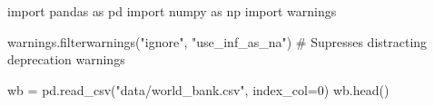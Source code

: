 \documentclass[
  letterpaper,
  DIV=11,
  numbers=noendperiod]{scrreprt}
\newenvironment{Shaded}{\begin{snugshade}}{\end{snugshade}}
\newcommand{\CommentTok}[1]{\textcolor[rgb]{0.37,0.37,0.37}{#1}}
\newcommand{\DecValTok}[1]{\textcolor[rgb]{0.68,0.00,0.00}{#1}}
\newcommand{\ImportTok}[1]{\textcolor[rgb]{0.00,0.46,0.62}{#1}}
\newcommand{\NormalTok}[1]{\textcolor[rgb]{0.00,0.23,0.31}{#1}}
\newcommand{\OperatorTok}[1]{\textcolor[rgb]{0.37,0.37,0.37}{#1}}
\newcommand{\StringTok}[1]{\textcolor[rgb]{0.13,0.47,0.30}{#1}}
\begin{document}
\begin{Shaded}
\begin{Highlighting}[]
\ImportTok{import}\NormalTok{ pandas }\ImportTok{as}\NormalTok{ pd}
\ImportTok{import}\NormalTok{ numpy }\ImportTok{as}\NormalTok{ np}
\ImportTok{import}\NormalTok{ warnings }

\NormalTok{warnings.filterwarnings(}\StringTok{"ignore"}\NormalTok{, }\StringTok{"use\_inf\_as\_na"}\NormalTok{) }\CommentTok{\# Supresses distracting deprecation warnings}

\NormalTok{wb }\OperatorTok{=}\NormalTok{ pd.read\_csv(}\StringTok{"data/world\_bank.csv"}\NormalTok{, index\_col}\OperatorTok{=}\DecValTok{0}\NormalTok{)}
\NormalTok{wb.head()}
\end{Highlighting}
\end{Shaded}
\end{document}
